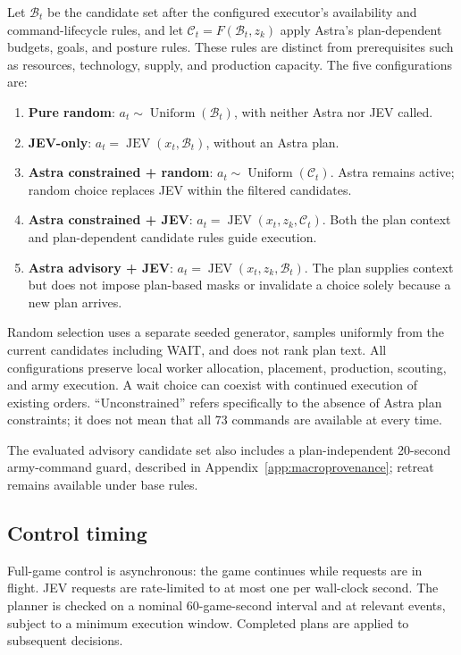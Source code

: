 \documentclass{article}
\begin{document}
Let $\mathcal{B}_t$ be the candidate set after the configured executor's availability and command-lifecycle rules, and let $\mathcal{C}_t=F(\mathcal{B}_t,z_k)$ apply Astra's plan-dependent budgets, goals, and posture rules. These rules are distinct from prerequisites such as resources, technology, supply, and production capacity. The five configurations are:

\begin{enumerate}
\item \textbf{Pure random}: $a_t\sim\operatorname{Uniform}(\mathcal{B}_t)$, with neither Astra nor JEV called.
\item \textbf{JEV-only}: $a_t=\operatorname{JEV}(x_t,\mathcal{B}_t)$, without an Astra plan.
\item \textbf{Astra constrained + random}: $a_t\sim\operatorname{Uniform}(\mathcal{C}_t)$. Astra remains active; random choice replaces JEV within the filtered candidates.
\item \textbf{Astra constrained + JEV}: $a_t=\operatorname{JEV}(x_t,z_k,\mathcal{C}_t)$. Both the plan context and plan-dependent candidate rules guide execution.
\item \textbf{Astra advisory + JEV}: $a_t=\operatorname{JEV}(x_t,z_k,\mathcal{B}_t)$. The plan supplies context but does not impose plan-based masks or invalidate a choice solely because a new plan arrives.
\end{enumerate}

Random selection uses a separate seeded generator, samples uniformly from the current candidates including WAIT, and does not rank plan text. All configurations preserve local worker allocation, placement, production, scouting, and army execution. A wait choice can coexist with continued execution of existing orders. ``Unconstrained'' refers specifically to the absence of Astra plan constraints; it does not mean that all 73 commands are available at every time.

The evaluated advisory candidate set also includes a plan-independent 20-second army-command guard, described in Appendix~\ref{app:macroprovenance}; retreat remains available under base rules.

\subsection{Control timing}

Full-game control is asynchronous: the game continues while requests are in flight. JEV requests are rate-limited to at most one per wall-clock second. The planner is checked on a nominal 60-game-second interval and at relevant events, subject to a minimum execution window. Completed plans are applied to subsequent decisions.
\end{document}
